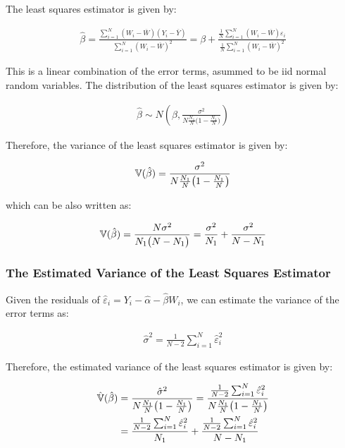 The least squares estimator is given by:

\begin{align}
    \hat\beta = \frac{\sum_{i=1}^N (W_i - \overline{W})(Y_i - \overline{Y})}{\sum_{i=1}^N (W_i - \overline{W})^2} = \beta + \frac{\frac{1}{N} \sum_{i=1}^N (W_i - \overline{W})\varepsilon_i}{\frac{1}{N} \sum_{i=1}^N (W_i - \overline{W})^2}
\end{align}

This is a linear combination of the error terms, asummed to be iid normal random variables. The distribution of the least squares estimator is given by:

\begin{align}
    \hat\beta \sim N\left(\beta, \frac{\sigma^2}{N\frac{N_1}{N}\bigl(1-\frac{N_1}{N}\bigr)}\right)
\end{align}

Therefore, the variance of the least squares estimator is given by:

\begin{align}
    {\mathbb{V}}(\hat\beta) = \frac{\sigma^2}{N\frac{N_1}{N}\bigl(1-\frac{N_1}{N}\bigr)}
\end{align}

which can be also written as:

\begin{align}
    {\mathbb{V}}(\hat\beta) = \frac{N\sigma^2}{N_1\bigl(N-N_1\bigr)} = \frac{\sigma^2}{N_1} + \frac{\sigma^2}{N-N_1}
\end{align}

\subsubsection{The Estimated Variance of the Least Squares Estimator}

Given the residuals of $\hat{\varepsilon}_i = Y_i - \hat\alpha - \hat\beta W_i$, we can estimate the variance of the error terms as:

\begin{align}
    \hat{\sigma}^2 = \frac{1}{N-2}\sum_{i=1}^N \hat{\varepsilon}_i^2
\end{align}

Therefore, the estimated variance of the least squares estimator is given by:

\begin{align}
    \hat{{\mathbb{V}}}(\hat\beta) &= \frac{\hat{\sigma}^2}{N\frac{N_1}{N}\bigl(1-\frac{N_1}{N}\bigr)} =  \frac{\frac{1}{N-2}\sum_{i=1}^N \hat{\varepsilon}_i^2}{N\frac{N_1}{N}\bigl(1-\frac{N_1}{N}\bigr)}\\
    &= \frac{\frac{1}{N-2}\sum_{i=1}^N \hat{\varepsilon}_i^2}{N_1} + \frac{\frac{1}{N-2}\sum_{i=1}^N \hat{\varepsilon}_i^2}{N-N_1} 
\end{align}

